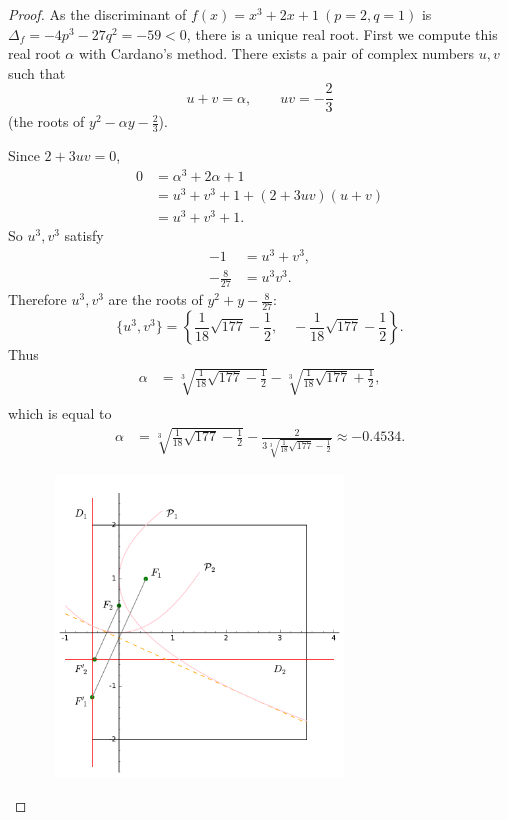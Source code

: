 \documentclass[11pt,a4paper]{article}
\begin{document}
\begin{proof}
As the discriminant of  $f(x) = x^3+2x+1\ (p=2,q=1)$ is $\Delta_f = -4p^3-27q^2 = -59<0$, there is a unique real root.
First we compute this real root $\alpha$ with Cardano's method. There exists a pair of complex numbers $u,v$ such that
$$ u+v = \alpha, \qquad uv = -\frac{2}{3}$$
(the roots of $y^2 - \alpha y -\frac{2}{3}$).

Since $2+3uv=0$,
\begin{align*}
0 &= \alpha^3+2\alpha+1\\
&= u^3+v^3+1+ (2 + 3 uv)(u+v)\\
&= u^3+v^3+1.
\end{align*}
So $u^3,v^3$ satisfy
\begin{align*}
-1 &=u^3 + v^3 ,\\
-\frac{8}{27} &=u^3v^3.
\end{align*}
Therefore $u^3,v^3$ are the roots of $y^2 +y - \frac{8}{27}$:
$$\{u^3,v^3\} = \left \{\frac{1}{18} \sqrt{177} - \frac{1}{2},\quad - \frac{1}{18} \sqrt{177} - \frac{1}{2}\right \}.$$
Thus
\begin{align*}
\alpha &= \sqrt[3]{\frac{1}{18} \sqrt{177} - \frac{1}{2}} - \sqrt[3]{\frac{1}{18} \sqrt{177} + \frac{1}{2}},\\
\end{align*}
which is equal to
\begin{align*}
\alpha &= \sqrt[3]{\frac{1}{18} \sqrt{177} - \frac{1}{2}} - \frac{2}{3 \sqrt[3]{\frac{1}{18} \sqrt{177} - \frac{1}{2}}} \approx -0.4534.
\end{align*}

\begin{figure}[htbp]
\begin{center}
\includegraphics [width=8cm,height=8cm] {cubic_equation.pdf}
\end{center}
\end{figure}


\end{proof}
\end{document}
